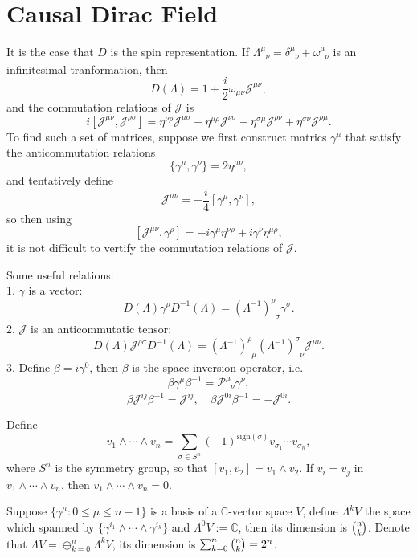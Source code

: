 \documentclass[9pt]{extbook}
\begin{document}
\section{Causal Dirac Field}
It is the case that $D$ is the spin representation. If $\Lambda^\mu_{\phantom{\mu}\nu}=\delta^\mu_{\phantom{\mu}\nu}+\omega^\mu_{\phantom{\mu}\nu}$ is an infinitesimal tranformation, then
\[
	D(\Lambda)=1+\frac{i}{2}\omega_{\mu\nu} \mathscr{J}^{\mu\nu},
\]
and the commutation relations of $\mathscr{J}$ is
\[
	i\left[\mathscr{J}^{\mu\nu},\mathscr{J}^{\rho \sigma}\right]=
	\eta^{\nu\rho}\mathscr{J}^{\mu \sigma}-
	\eta^{\mu \rho}\mathscr{J}^{\nu \sigma}-
	\eta^{\sigma\mu}\mathscr{J}^{\rho \nu}+
	\eta^{\sigma\nu}\mathscr{J}^{\rho \mu}.
\]
To find such a set of matrices, suppose we first construct matrics $\gamma^\mu$ that satisfy the anticommutation relations
\[
	\{\gamma^\mu,\gamma^\nu\}=2\eta^{\mu\nu},
\]
and tentatively define
\[
	\mathscr{J}^{\mu\nu}=-\frac{i}{4}[\gamma^\mu,\gamma^\nu],
\]
so then using
\[
	[\mathscr{J}^{\mu\nu},\gamma^\rho]=-i\gamma^\mu \eta^{\nu\rho}+i\gamma^\nu \eta^{\mu\rho},
\]
it is not difficult to vertify the commutation relations of $\mathscr{J}$.

Some useful relations:\\
1. $\gamma$ is a vector:
\[
	D(\Lambda)\gamma^\rho D^{-1}(\Lambda)=(\Lambda^{-1})^\rho_{\phantom{\rho}\sigma}\gamma^\sigma.
\]
2. $\mathscr{J}$ is an anticommutatic tensor:
\[
	D(\Lambda)\mathscr{J}^{\rho\sigma} D^{-1}(\Lambda)=(\Lambda^{-1})^\rho_{\phantom{\rho}\mu}(\Lambda^{-1})^\sigma_{\phantom{\sigma}\nu}\mathscr{J}^{\mu\nu}.
\]
3. Define $\beta=i\gamma^0$, then $\beta$ is the space-inversion operator, i.e.
\[
	\beta \gamma^\mu \beta^{-1}=\mathscr{P}^\mu_{\phantom{\mu}\nu}\gamma^\nu,
\]
\[
	\beta \mathscr{J}^{ij} \beta^{-1}=\mathscr{J}^{ij}, \quad \beta \mathscr{J}^{0i} \beta^{-1}=-\mathscr{J}^{0i}.
\]

Define
\[
	v_1\wedge \cdots \wedge v_n=\sum_{\sigma\in S^n}(-1)^{\mathrm{sign}(\sigma)}v_{\sigma_1}\cdots v_{\sigma_n},
\]
where $S^n$ is the symmetry group, so that $[v_1,v_2]=v_1\wedge v_2$. If $v_i=v_j$ in $v_1\wedge \cdots \wedge v_n$, then $v_1\wedge \cdots \wedge v_n=0$.

Suppose $\{\gamma^\mu: 0 \leq \mu \leq n-1\}$ is a basis of a $\mathbb{C}$-vector space $V$, define $\Lambda^kV$ the space which spanned by $\{\gamma^{i_1}\wedge \cdots \wedge \gamma^{i_k}\}$ and $\Lambda^0V:=\mathbb{C}$, then its dimension is $\tbinom{n}{k}$. Denote that $\Lambda V=\oplus_{k=0}^n \Lambda^kV$, its dimension is $\sum_{k=0}^{n}\tbinom{n}{k}=2^{n}$.
\end{document}
